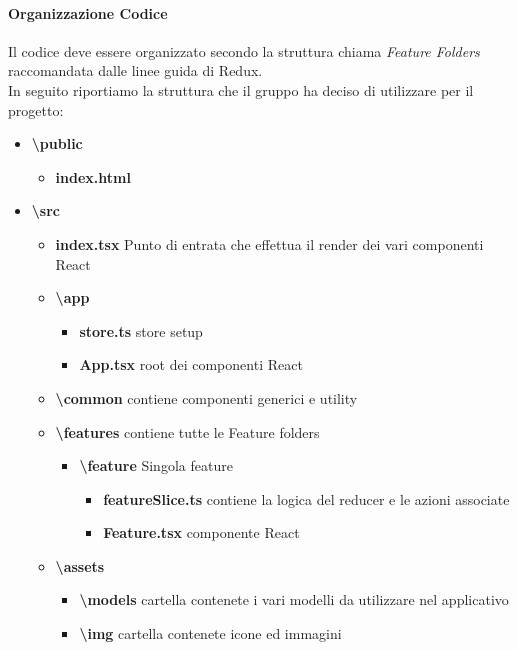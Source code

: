 	\paragraph{Organizzazione Codice}
	Il codice deve essere organizzato secondo la struttura chiama \textit{Feature Folders} raccomandata dalle linee guida di Redux.\\
	In seguito riportiamo la struttura che il gruppo ha deciso di utilizzare per il progetto:
	\begin{itemize}
		\item \textbf{\textbackslash public}
			\begin{itemize}
				\item \textbf{index.html} 
			\end{itemize}
		\item \textbf{\textbackslash src} 
			\begin{itemize}
				\item \textbf{index.tsx} Punto di entrata che effettua il render dei vari componenti React
				\item 	\textbf{\textbackslash app}
					\begin{itemize}
						\item \textbf{store.ts} store setup
						\item \textbf{App.tsx} root dei componenti React
					\end{itemize}
				\item \textbf{\textbackslash common} contiene componenti generici e utility
			 	\item \textbf{\textbackslash features} contiene tutte le Feature folders
			 	\begin{itemize}
			 		\item \textbf{\textbackslash feature} Singola feature
			 		\begin{itemize}
			 			\item \textbf{featureSlice.ts} contiene la logica del reducer e le azioni associate
			 			\item \textbf{Feature.tsx} componente React
			 		\end{itemize}
			  \end{itemize}
			  \item \textbf{\textbackslash assets}
					\begin{itemize}
						\item \textbf{\textbackslash models} cartella contenete i vari modelli da utilizzare nel applicativo
						\item \textbf{\textbackslash img} cartella contenete icone ed immagini
					\end{itemize}
			\end{itemize}
\end{itemize}				
	
